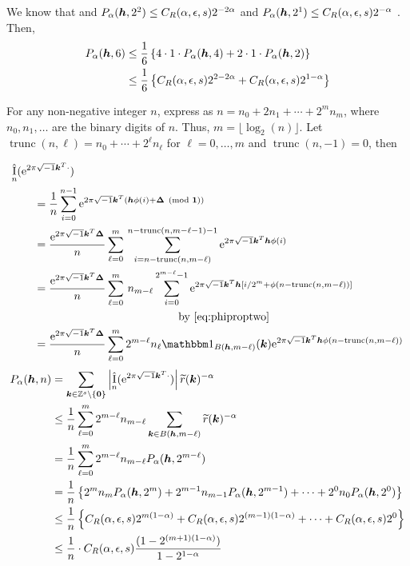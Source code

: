 \documentclass{amsart}
\newcommand{\tr}{\widetilde{r}}
\DeclareMathOperator{\appxint}{\hat{I}}
\DeclareMathOperator{\trun}{trunc}
\begin{document}
We know that and $P_\alpha(\boldsymbol{h},2^2) \le C_{R}(\alpha,\epsilon,s)
    2^{-2\alpha}$ and $P_\alpha(\boldsymbol{h},2^1) \le C_{R}(\alpha,\epsilon,s)
    2^{-\alpha} $ . Then,
    \begin{align*}
        P_\alpha(\boldsymbol{h},6) & \le \frac {1}{6} \left\{ 4 \cdot 1 \cdot P_\alpha(\boldsymbol{h},4) + 2 \cdot 1 \cdot P_\alpha(\boldsymbol{h},2) \right\} \\
         & \le \frac {1}{6} \left\{C_{R}(\alpha,\epsilon,s)
         2^{2-2\alpha} + C_{R}(\alpha,\epsilon,s)
         2^{1-\alpha} \right\}
    \end{align*}

    
For any non-negative integer $n$, express as  $n = n_0 + 2n_1 + \cdots + 2^m n_m$, where $n_0, n_1, \ldots$ are the binary digits of $n$.  Thus, $m = \lfloor \log_2(n) \rfloor$.  Let $\trun(n,\ell) = n_0 + \cdots + 2^{\ell} n_{\ell}$ for $\ell = 0, \ldots, m$ and $\trun(n,-1) = 0$, then 

\begin{align*}
    \MoveEqLeft{\appxint_{n}(\me^{2 \pi \sqrt{-1} \vk^T \cdot}) } \\
    &= \frac 1{n} \sum_{i=0}^{n-1} \me^{2 \pi \sqrt{-1} \vk^T (\vh\phi(i) + \vDelta \pmod{\vone})} \\
    \nonumber
    &= \frac {\me^{2 \pi \sqrt{-1} \vk^T \vDelta}}{n} \sum_{\ell = 0}^{m} \, 
    \sum_{i=n - \trun(n,m-\ell) }^{n - \trun(n,m-\ell-1)  -1} \me^{2 \pi \sqrt{-1} \vk^T \vh\phi(i)} \\
    &= \frac {\me^{2 \pi \sqrt{-1} \vk^T \vDelta}}{n} \sum_{\ell = 0}^{m} \, n_{m-\ell}
    \sum_{i=0 }^{2^{m-\ell}  -1} \me^{2 \pi \sqrt{-1} \vk^T \vh[i/2^m + \phi(n - \trun(n,m-\ell))]} \\
    & \hspace{30ex} \text{by \eqref{eq:phiproptwo}} \\
    & = \frac {\me^{2 \pi \sqrt{-1} \vk^T \vDelta}}{n} \sum_{\ell = 0}^{m} 2^{m-\ell} n_\ell \bbone_{B(\vh,m-\ell)}(\vk) \me^{2 \pi \sqrt{-1} \vk^T \vh\phi(n - \trun(n,m-\ell))} 
\end{align*}
\begin{align*}
      P_\alpha(\vh,n) & = \sum_{\vk \in \integers^s \setminus\{\vzero\}} \abs{\appxint_n(\me^{2 \pi \sqrt{-1} \vk^T \cdot})}\tr(\vk)^{-\alpha} \\
      & \le \frac {1}{n} \sum_{\ell = 0}^{m} 2^{m-\ell} n_{m - \ell} \sum_{\vk \in B(\vh,m-\ell)} \tr(\vk)^{-\alpha} \\
      & = \frac {1}{n} \sum_{\ell = 0}^{m} 2^{m-\ell} n_{m - \ell} P_\alpha(\vh,2^{m-\ell}) \\
      & =  \frac {1}{n} \left\{ 2^m n_m P_\alpha(\vh,2^m) + 2^{m-1} n_{m-1} P_\alpha(\vh,2^{m-1}) + \cdots + 2^0 n_0 P_\alpha(\vh,2^0)  \right\} \\
      & \le \frac {1}{n} \left\{ C_{R}(\alpha,\epsilon,s) 2^{m(1-\alpha)} + C_{R}(\alpha,\epsilon,s) 2^{(m-1)(1-\alpha)} + \cdots +  C_{R}(\alpha,\epsilon,s) 2^{0}\right\} \\
      & \le \frac {1}{n} \cdot C_{R}(\alpha,\epsilon,s) \frac{(1 - 2^{(m+1)(1-\alpha)})}{1 - 2^{1-\alpha}}%
\end{align*}
\end{document}
